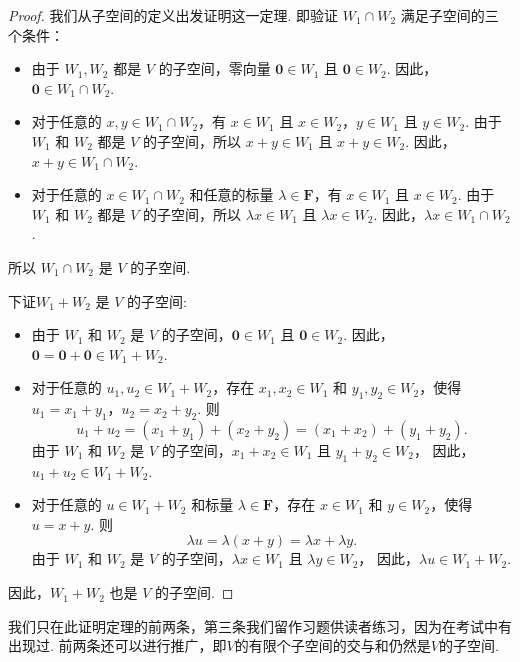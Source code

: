 \begin{proof}
    我们从子空间的定义出发证明这一定理.
    即验证 $W_1 \cap W_2$ 满足子空间的三个条件：

    \begin{itemize}
        \item
              由于 $W_1, W_2$ 都是 $V$ 的子空间，零向量 $\mathbf{0} \in W_1$ 且 $\mathbf{0} \in W_2$. 因此，$\mathbf{0} \in W_1 \cap W_2$.

        \item
              对于任意的 $x, y \in W_1 \cap W_2$，有 $x \in W_1$ 且 $x \in W_2$，$y \in W_1$ 且 $y \in W_2$.
              由于 $W_1$ 和 $W_2$ 都是 $V$ 的子空间，所以 $x + y \in W_1$ 且 $x + y \in W_2$.
              因此，$x + y \in W_1 \cap W_2$.

        \item
              对于任意的 $x \in W_1 \cap W_2$ 和任意的标量 $\lambda \in \mathbf{F}$，有 $x \in W_1$ 且 $x \in W_2$.
              由于 $W_1$ 和 $W_2$ 都是 $V$ 的子空间，所以 $\lambda x \in W_1$ 且 $\lambda x \in W_2$.
              因此，$\lambda x \in W_1 \cap W_2$.
    \end{itemize}

    所以 $W_1 \cap W_2$ 是 $V$ 的子空间.

    下证$W_1 + W_2$ 是 $V$ 的子空间:
    \begin{itemize}
        \item
              由于 $W_1$ 和 $W_2$ 是 $V$ 的子空间，$\mathbf{0} \in W_1$ 且 $\mathbf{0} \in W_2$.
              因此，$\mathbf{0} = \mathbf{0} + \mathbf{0} \in W_1 + W_2$.

        \item
              对于任意的 $u_1, u_2 \in W_1 + W_2$，存在 $x_1, x_2 \in W_1$ 和 $y_1, y_2 \in W_2$，使得 $u_1 = x_1 + y_1$，$u_2 = x_2 + y_2$.
              则
              \[
                  u_1 + u_2 = (x_1 + y_1) + (x_2 + y_2) = (x_1 + x_2) + (y_1 + y_2).
              \]
              由于 $W_1$ 和 $W_2$ 是 $V$ 的子空间，$x_1 + x_2 \in W_1$ 且 $y_1 + y_2 \in W_2$，
              因此，$u_1 + u_2 \in W_1 + W_2$.

        \item
              对于任意的 $u \in W_1 + W_2$ 和标量 $\lambda \in \mathbf{F}$，存在 $x \in W_1$ 和 $y \in W_2$，使得 $u = x + y$.
              则
              \[
                  \lambda u = \lambda (x + y) = \lambda x + \lambda y.
              \]
              由于 $W_1$ 和 $W_2$ 是 $V$ 的子空间，$\lambda x \in W_1$ 且 $\lambda y \in W_2$，
              因此，$\lambda u \in W_1 + W_2$.
    \end{itemize}

    因此，$W_1 + W_2$ 也是 $V$ 的子空间.
\end{proof}
我们只在此证明定理的前两条，第三条我们留作习题供读者练习，因为在考试中有出现过. 前两条还可以进行推广，即$V$的有限个子空间的交与和仍然是$V$的子空间.

